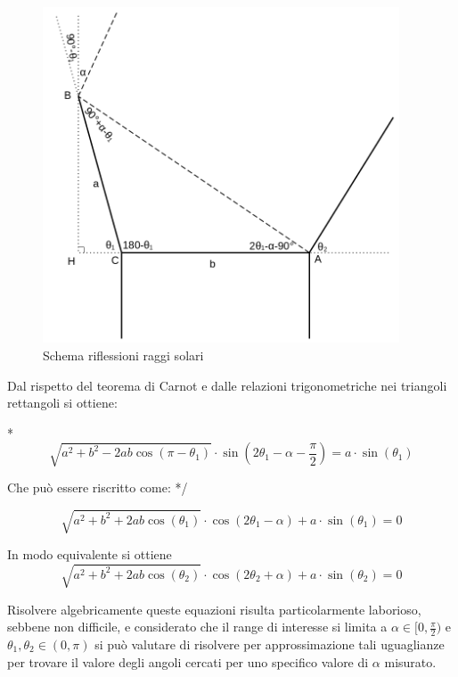\documentclass[12pt]{article}
\begin{document}
    \begin{figure}[h]
    \centering
        \includegraphics[width=300pt]{Draws/Reflection_schematics_trig.png}
        \caption{Schema riflessioni raggi solari}
        \label{sun_reflection}
    \end{figure}
    
    \noindent
    Dal rispetto del teorema di Carnot e dalle relazioni trigonometriche nei triangoli rettangoli si ottiene:
 
\/*
    \begin{equation}
        \sqrt{a^2 + b^2 - 2 a b \cos(\pi-\theta_1)}  \cdot \sin \left(2 \theta_1 - \alpha - \frac{\pi}{2} \right) = a \cdot \sin(\theta_1)
    \end{equation}

    \noindent
    Che può essere riscritto come:
*/

    \begin{equation}
        \sqrt{a^2 + b^2 + 2 a b \cos(\theta_1)}  \cdot \cos(2 \theta_1 - \alpha) + a \cdot \sin(\theta_1) = 0
    \end{equation}
    
    \noindent
    In modo equivalente si ottiene
    \begin{equation}
        \sqrt{a^2 + b^2 + 2 a b \cos(\theta_2)}  \cdot \cos(2 \theta_2 + \alpha) + a \cdot \sin(\theta_2) = 0
    \end{equation}
    
    
    Risolvere algebricamente queste equazioni risulta particolarmente laborioso, sebbene non difficile, e considerato che il range di interesse si limita a $\alpha \in [0, \frac{\pi}{2})$ e $\theta_1, \theta_2 \in (0, \pi)$ si può valutare di risolvere per approssimazione tali uguaglianze per trovare il valore degli angoli cercati per uno specifico valore di $\alpha$ misurato.\\
    
\end{document}
